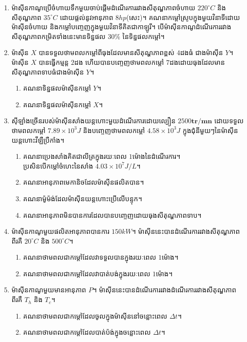 \begin{enumerate}
		\item ម៉ាសុីនកាណូប្រើចំហាយទឹកមួយចាប់ផ្តើមដំណើរការរវាងសីតុណ្ហភាពចំហាយ $220^\circ C$ និងសីតុណ្ហភាព $35^\circ C$ ដោយផ្តល់នូវអានុភាព $8hp$(សេះ)។ គណនាកម្តៅស្រូបក្នុងមួយវិនាទីដោយម៉ាសុីនចំហាយ និងកម្តៅបញ្ចេញក្នុងមួយវិនាទីគិតជាកាឡូរី។ បើម៉ាសុីនកាណូដំណើរការរវាងសីតុណ្ហភាពកម្រិតទាំងនេះមានទិន្នផល $30\%$ នៃទិន្នផលកម្តៅ។
		\item ម៉ាសុីន $X$ បានទទួលថាមពលកម្តៅពីធុងដែលមានសីតុណ្ហភាពខ្ពស់ $4$ដងធំ ជាងម៉ាសុីន $Y$។ ម៉ាសុីន $X$ បានធ្វើកម្មន្ត $2$ដង ហើយបានបញ្ចេញថាមពលកម្តៅ $7$ដងដោយធុងដែលមានសីតុណ្ហភាពទាបធំជាងម៉ាសុីន $Y$។
		\begin{enumerate}
			\item គណនាទិន្នផលម៉ាសុីនកម្តៅ $Y$។
			\item គណនាទិន្នផលម៉ាសុីនកម្តៅ $X$។
		\end{enumerate}
		\item សុីឡាំងច្រើនរបស់ម៉ាសុីនសាំងយន្តហោះមួយដំណើរការដោយល្បឿន $2500\mathbf{tr/mn}$ ដោយទទួលថាមពលកម្តៅ $7.89\times10^{3}J$ និងបញ្ចេញថាមពលកម្តៅ $4.58\times10^{3}J$ ក្នុងជុំនីមួយៗនៃម៉ាសុីនយន្តហោះវីឡឺ​​​ប្រឺ​​កាំង។
		\begin{enumerate}
			\item គណនាប្រេងសាំងគិតជាលីត្រក្នុងរយៈពេល $1$ម៉ោងនៃដំណើរការ។\\ ប្រសិនបើកម្តៅចំហេះនៃសាំង $4.03\times10^{7}J/L$។
			\item គណនាអានុភាពមេកានិចដែលម៉ាសុីនផលិតបាន។
			\item គណនាម៉ូម៉ង់ដែលម៉ាសុីនយន្តហោះប្រើលើបន្ទុក។
			\item គណនាអានុភាពមិនបានការដែលបានបញ្ចេញដោយធុងសីតុណ្ហភាពទាប។
		\end{enumerate}
		\item ម៉ាសុីនកាណូមួយផលិតអានុភាពបានការ $150kW$។ ម៉ាសុីននេះបានដំណើរការរវាងសីតុណ្ហភាពពីរគឺ $20^\circ C$ និង $500^\circ C$។
		\begin{enumerate}
			\item គណនាថាមពលជាកម្តៅដែលវាទទួលបានក្នុងរយៈពេល $1$ម៉ោង។
			\item គណនាថាមពលជាកម្តៅដែលវាបាត់បង់ក្នុងរយៈពេល $1$ម៉ោង។
		\end{enumerate}
		\item ម៉ាសុីនកាណូមួយមានអានុភាព $P$។ ម៉ាសុីននេះបានដំណើរការរវាងដំណើរការរវាងសីតុណ្ហភាពពីរគឺ $T_{h}$ និង $T_{c}$។
		\begin{enumerate}
			\item គណនាថាមពលជាកម្តៅដែលចូលក្នុងម៉ាសុីននៅចន្លោះពេល $\Delta t$។
			\item គណនាថាមពលជាកម្តៅដែលបាត់ប៉ង់ក្នុងចន្លោះពេល $\Delta t$។
		\end{enumerate}

\end{enumerate}
